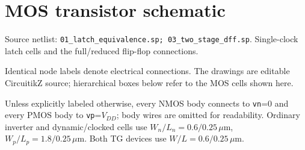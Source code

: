 \clearpage\section{MOS transistor schematic}
\begingroup\small
Source netlist: \texttt{01\_latch\_equivalence.sp; 03\_two\_stage\_dff.sp}. Single-clock latch cells and the full/reduced flip-flop connections.

Identical node labels denote electrical connections. The drawings are editable CircuitikZ source; hierarchical boxes below refer to the MOS cells shown here.

Unless explicitly labeled otherwise, every NMOS body connects to \texttt{vn}=0 and every PMOS body to \texttt{vp}=\(V_{DD}\); body wires are omitted for readability. Ordinary inverter and dynamic/clocked cells use \(W_n/L_n=0.6/0.25\,\mu\mathrm m\), \(W_p/L_p=1.8/0.25\,\mu\mathrm m\). Both TG devices use \(W/L=0.6/0.25\,\mu\mathrm m\). 

